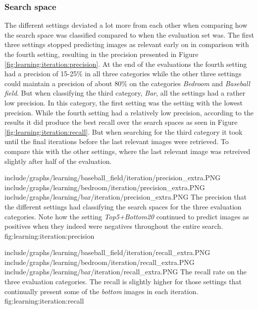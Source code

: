 \subsubsection{Search space}
\label{sec:res:learning:iter}
The different settings deviated a lot more from each other when comparing how the search space was classified compared to when the evaluation set was. The first three settings stopped predicting images as relevant early on in comparison with the fourth setting, resulting in the precision presented in Figure \ref{fig:learning:iteration:precision}. At the end of the evaluations the fourth setting had a precision of 15-25\% in all three categories while the other three settings could maintain a precision of about 80\% on the categories \emph{Bedroom} and \emph{Baseball field}. But when classifying the third category, \emph{Bar}, all the settings had a rather low precision. In this category, the first setting was the setting with the lowest precision. While the fourth setting had a relatively low precision, according to the results it did produce the best recall over the search spaces as seen in Figure \ref{fig:learning:iteration:recall}. But when searching for the third category it took until the final iterations before the last relevant images were retrieved. To compare this with the other settings, where the last relevant image was retreived slightly after half of the evaluation. 

\tripfigurenear
{include/graphs/learning/baseball_field/iteration/precision_extra.PNG}
{include/graphs/learning/bedroom/iteration/precision_extra.PNG}
{include/graphs/learning/bar/iteration/precision_extra.PNG}
{The precision that the different settings had classifying the search spaces for the three evaluation categories. Note how the setting \emph{Top5+Bottom20} continued to predict images as positives when they indeed were negatives throughout the entire search.}
{fig:learning:iteration:precision}

\tripfigurenear
{include/graphs/learning/baseball_field/iteration/recall_extra.PNG}
{include/graphs/learning/bedroom/iteration/recall_extra.PNG}
{include/graphs/learning/bar/iteration/recall_extra.PNG}
{The recall rate on the three evaluation categories. The recall is slightly higher for those settings that continually present some of the \emph{bottom} images in each iteration.}
{fig:learning:iteration:recall}

